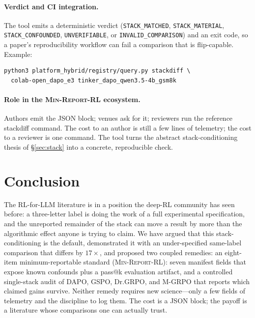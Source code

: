 \documentclass[11pt]{article}
\newcommand{\minreport}{\textsc{Min-Report-RL}}
\begin{document}
\paragraph{Verdict and CI integration.} The tool emits a deterministic verdict
(\texttt{STACK\_MATCHED}, \texttt{STACK\_MATERIAL}, \texttt{STACK\_CONFOUNDED},
\texttt{UNVERIFIABLE}, or \texttt{INVALID\_COMPARISON}) and an exit code, so a
paper's reproducibility workflow can fail a comparison that is
flip-capable. Example:
\begin{verbatim}
python3 platform_hybrid/registry/query.py stackdiff \
  colab-open_dapo_e3 tinker_dapo_qwen3.5-4b_gsm8k
\end{verbatim}

\paragraph{Role in the \minreport{} ecosystem.} Authors emit the JSON block;
venues ask for it; reviewers run the reference stackdiff command. The cost to an author
is still a few lines of telemetry; the cost to a reviewer is one command. The
tool turns the abstract stack-conditioning thesis of \S\ref{sec:stack} into a
concrete, reproducible check.

\section{Conclusion}
\label{sec:conclusion}


The RL-for-LLM literature is in a position the deep-RL community has seen
before: a three-letter label is doing the work of a full experimental
specification, and the unreported remainder of the stack can move a result by
more than the algorithmic effect anyone is trying to claim. We have argued that
this stack-conditioning is the default, demonstrated it with an under-specified
same-label comparison that differs by $17\times$, and proposed two coupled remedies: an
eight-item minimum-reportable standard (\minreport{}): seven manifest fields
that expose known confounds plus a pass@k evaluation artifact, and a controlled
single-stack audit of DAPO, GSPO,
Dr.GRPO, and M-GRPO that reports which claimed gains survive. Neither remedy
requires new science---only a few fields of telemetry and the discipline to log
them. The cost is a JSON block; the payoff is a literature whose comparisons one
can actually trust.



\end{document}
